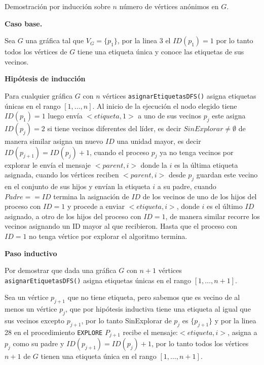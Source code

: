 Demostración por inducción sobre $n$ número de vértices anónimos en $G$.

\textbf{Caso base.} 

Sea $G$ una gráfica tal que $V_G=\{p_1\}$, por la linea $3$ el $ID(p_1)=1$ por lo tanto todos los vértices de $G$ tiene una etiqueta única y conoce las etiquetas de sus vecinos.

\textbf{Hipótesis de inducción}

Para cualquier gráfica $G$ con $n$ vértices {\tt asignarEtiquetasDFS()} asigna etiquetas únicas en el rango $[1,\dots, n]$.
Al inicio de la ejecución el nodo elegido tiene $ID(p_1)=1$ luego envía $<etiqueta, 1>$ a uno de sus vecinos $p_{j}$ este asigna $ID(p_j)=2$ si tiene vecinos diferentes del líder, es decir $SinExplorar \neq \emptyset$ de manera similar asigna un nuevo $ID$ una unidad mayor, es decir $ID(p_{j+1}) = ID(p_j)+1$, cuando el proceso $p_j$ ya no tenga vecinos por explorar le envía el mensaje $<parent,i>$ donde la $i$ es la última etiqueta asignada, cuando los vértices reciben $<parent,i>$ desde $p_j$ guardan este vecino en el conjunto de sus hijos y envían la etiqueta $i$ a su padre, cuando $Padre == ID$ termina la asignación de $ID$ de los vecinos de uno de los hijos del proceso con $ID=1$  y procede a enviar $<etiqueta,i>$, donde $i$ es el último $ID$ asignado, a otro de los hijos del proceso con $ID = 1$, de manera similar recorre los vecinos asignando un ID mayor al que recibieron. Hasta que el proceso con $ID = 1$ no tenga vértice por explorar el algoritmo termina.

\textbf{Paso inductivo}

Por demostrar que dada una gráfica $G$ con $n+1$ vértices {\tt asignarEtiquetasDFS()} asigna etiquetas únicas en el rango $[1,\dots, n+1]$.

Sea un vértice $p_{j+1}$ que no tiene etiqueta, pero sabemos que es vecino de al menos un vértice $p_j$, que por hipótesis inductiva tiene una etiqueta al igual que sus vecinos excepto $p_{j+1}$, por lo tanto SinExplorar de $p_j$ es $\{p_{j+1}\}$ y por la linea 28 en el procedimiento {\tt EXPLORE} $P_{j+1}$ recibe el mensaje:$<etiqueta,i>$, asigna a $p_j$ como su padre y $ID(p_{j+1})=ID(p_j)+1$, por lo tanto todos los vértices $n+1$ de $G$ tienen una etiqueta única en el rango $[1,\dots, n+1]$.

